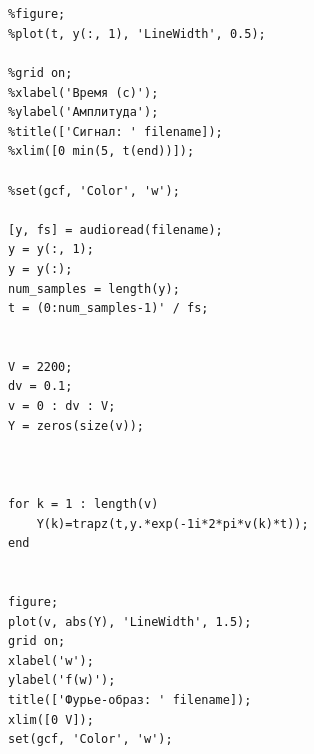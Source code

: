 \documentclass[a4paper, 12pt]{article}
\begin{document}
\begin{lstlisting}[caption={Код для обработки звукового сигнала}]


%figure;
%plot(t, y(:, 1), 'LineWidth', 0.5); 

%grid on;
%xlabel('Время (с)');
%ylabel('Амплитуда'); 
%title(['Сигнал: ' filename]);
%xlim([0 min(5, t(end))]); 

%set(gcf, 'Color', 'w');

[y, fs] = audioread(filename);
y = y(:, 1);
y = y(:);
num_samples = length(y);
t = (0:num_samples-1)' / fs;


V = 2200;
dv = 0.1;
v = 0 : dv : V;
Y = zeros(size(v));



for k = 1 : length(v)
    Y(k)=trapz(t,y.*exp(-1i*2*pi*v(k)*t));
end


figure;
plot(v, abs(Y), 'LineWidth', 1.5);
grid on;
xlabel('w');
ylabel('f(w)');
title(['Фурье-образ: ' filename]);
xlim([0 V]);
set(gcf, 'Color', 'w');
\end{lstlisting}
\end{document}
